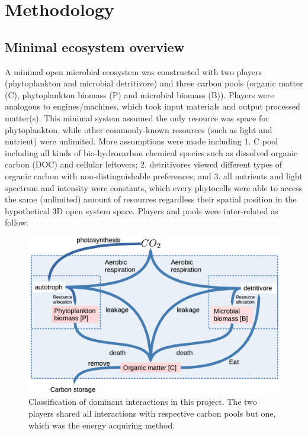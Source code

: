 \documentclass[../thesis.tex]{subfiles} %
\begin{document}
\section{Methodology}
\subsection{Minimal ecosystem overview}
A minimal open microbial ecosystem was constructed with two players (phytoplankton and microbial detritivore) and three carbon pools (organic matter (C), phytoplankton biomass (P) and microbial biomass (B)).  Players were analogous to engines/machines, which took input materials and output processed matter(s).  This minimal system assumed the only resource was space for phytoplankton, while other commonly-known resources (such as light and nutrient) were unlimited.  More assumptions were made including 1. C pool including all kinds of bio-hydrocarbon chemical species such as dissolved organic carbon (DOC) and cellular leftovers; 2. detritivores viewed different types of organic carbon with non-distinguishable preferences; and 3. all nutrients and light spectrum and intensity were constants, which every phytocells were able to access the same (unlimited) amount of resources regardless their spatial position in the hypothetical 3D open system space.  Players and pools were inter-related as follow:

\begin{figure}[H]
    \centering
    \includegraphics[width=.8\linewidth]{result/model.png}
    \caption[Model visualization]{Classification of dominant interactions in this project.  The two players shared all interactions with respective carbon pools but one, which was the energy acquiring method.}
    \label{modelInWord}
\end{figure}
\end{document}
